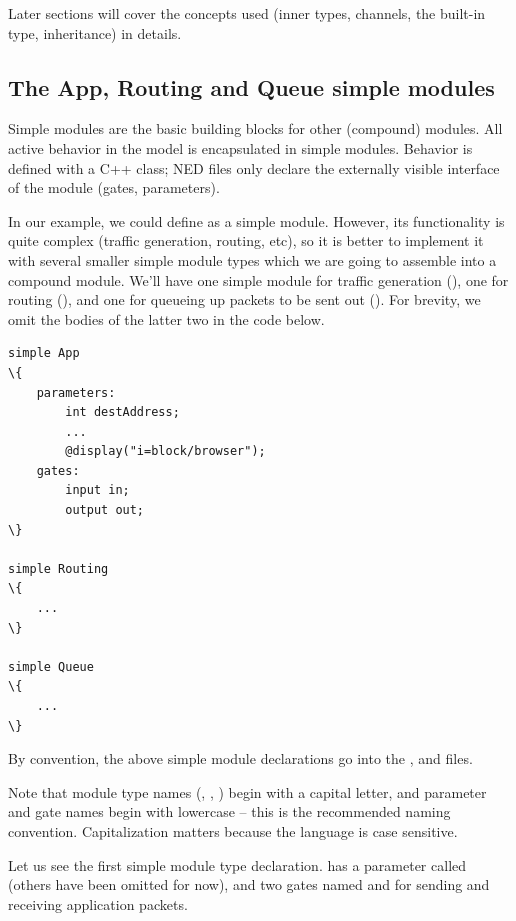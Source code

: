 Later sections will cover the concepts used (inner types, channels, the
 built-in type, inheritance) in details.


\subsection{The App, Routing and Queue simple modules}

Simple modules are the basic building blocks for other (compound) modules.
All active behavior in the model is encapsulated in simple modules.
Behavior is defined with a C++ class; NED files only declare the externally
visible interface of the module (gates, parameters).

In our example, we could define  as a simple module. However,
its functionality is quite complex (traffic generation, routing, etc),
so it is better to implement it with several smaller simple module types
which we are going to assemble into a compound module. We'll have
one simple module for traffic generation (), one for routing
(), and one for queueing up packets to be sent out ().
For brevity, we omit the bodies of the latter two in the code below.

\begin{Verbatim}[commandchars=\\\{\}]
simple App
\{
    parameters:
        int destAddress;
        ...
        @display("i=block/browser");
    gates:
        input in;
        output out;
\}

simple Routing
\{
    ...
\}

simple Queue
\{
    ...
\}
\end{Verbatim}

By convention, the above simple module declarations go into the
,  and  files.

\begin{note}
    Note that module type names (, , )
    begin with a capital letter, and parameter and gate names begin with
    lowercase -- this is the recommended naming convention. Capitalization
    matters because the language is case sensitive.
\end{note}

Let us see the first simple module type declaration.  has a
parameter called  (others have been omitted for now),
and two gates named  and  for sending and receiving
application packets.

